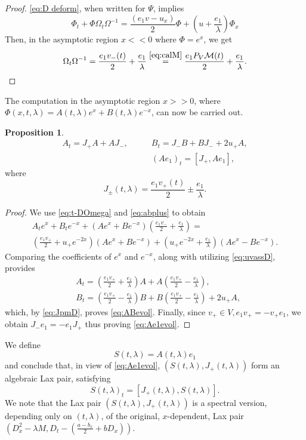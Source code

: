 \documentclass[10pt,a4paper]{article}
\numberwithin{equation}{section}
\theoremstyle{plain}
\theoremstyle{definition}
\newtheorem{proposition}[proposition]{Proposition}
\renewcommand{\l}{\lambda}
\begin{document}
\begin{proof}  \autoref{eq:D deform}, when written for $\Psi$, implies
\begin{equation*} 
\Phi_t+\Phi \Omega_t \Omega^{-1} =\frac{(e_1 v-u_x)}{2} \Phi+ (u+\frac{e_1}{\lambda}) \Phi_x
\end{equation*} 
Then, in the asymptotic region $x<< 0$ where $\Phi=e^x$, we 
get 
\begin{equation*}
 \Omega_t \Omega^{-1} =\frac{e_1 v_{-}(t)}{2} +\frac{e_1}{\l}\stackrel{\eqref{eq:calM}}{=} \frac{e_1P_V \mathcal{M}(t)}{2} +\frac{e_1}{\l} .   
\end{equation*}
\end{proof} 
The computation in the asymptotic region $x>>0$, where $\Phi(x,t, \l)=A(t,\l) e^x+B(t,\l) e^{-x}$,  can now be carried out.  
  
\begin{proposition} \label{prop:AB}
\begin{align} 
A_t=J_+A+AJ_-, \qquad & B_t=J_- B+BJ_-+2u_+ A, \label{eq:ABevol}\\
&(Ae_1)_t=[J_+, Ae_	1], \label{eq:Ae1evol}
\end{align} 
where 
\begin{equation} \label{eq:JpmD}
J_{\pm}(t,\l)=\frac{e_1v_{+}(t)}{2}\pm \frac{e_1}{\l}.
\end{equation} 
\end{proposition} 
\begin{proof} 
We use \eqref{eq:t-DOmega} and \eqref{eq:abplus} to obtain
\begin{align*} 
A _te^x+B_t e^{-x}+(Ae^x+Be^{-x})(\frac{e_1 v_-}{2}+\frac{e_1}{\l})=\\
(\frac{e_1 v_+}{2}+u_+ e^{-2x})(Ae^x+Be^{-x})+(u_+e^{-2x}+\frac{e_1}{\l})(Ae^x-Be^{-x}). 
\end{align*} 
Comparing the coefficients of $e^x$ and $e^{-x}$, along with utilizing \eqref{eq:uvassD}, provides 
\begin{align*}
&A_t=(\frac{e_1 v_+}{2}+\frac{e_1}{\l})A+A(\frac{e_1 v_+}{2}-\frac{e_1}{\l}), \\
&B_t=(\frac{e_1 v_+}{2}-\frac{e_1}{\l})B+B(\frac{e_1 v_+}{2}-\frac{e_1}{\l})+2u_+A,  
\end{align*}
which, by \eqref{eq:JpmD}, proves \eqref{eq:ABevol}.  Finally, since $v_+\in V, e_1 v_+=-v_+e_1$, we obtain  $J_-e_1=-e_1J_+$ thus proving  \eqref{eq:Ae1evol}.  
\end{proof} 
We define 
\begin{equation} \label{eq:defS}
S(t,\l)=A(t,\l)e_1
\end{equation} 
and conclude that, in view of \eqref{eq:Ae1evol}, $(S(t,\l),J_+(t,\l))$ form an algebraic Lax pair, satisfying
\begin{equation} \label{eq:LaxS}
S(t,\l)_t=[J_+(t,\l), S(t,\l)].  
\end{equation} 
We note that the Lax pair $(S(t,\l),J_+(t,\l))$ is a spectral version, depending only on $(t,\lambda)$,  of the original, $x$-dependent,  Lax 
pair $(D_x^2-\lambda M, D_t-(\frac{a-b_x}{2}+bD_x))$.  
\end{document}
